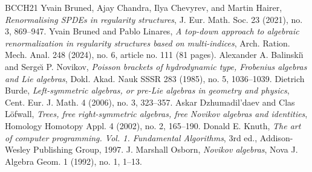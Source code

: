 \begin{thebibliography}{BCCH21}
 Yvain Bruned, Ajay Chandra, Ilya Chevyrev, and Martin Hairer, \emph{Renormalising SPDEs in regularity structures}, J. Eur. Math. Soc. 23 (2021), no. 3, 869--947.
 Yvain Bruned and Pablo Linares, \emph{A top-down approach to algebraic renormalization in regularity structures based on multi-indices}, Arch. Ration. Mech. Anal. 248 (2024), no. 6, article no. 111 (81 pages).
 Alexander A. Balinski\u\i{} and Serge\u\i{} P. Novikov, \emph{Poisson brackets of hydrodynamic type, Frobenius algebras and Lie algebras}, Dokl. Akad. Nauk SSSR 283 (1985), no. 5, 1036--1039.
 Dietrich Burde, \emph{Left-symmetric algebras, or pre-Lie algebras in geometry and physics}, Cent. Eur. J. Math. 4 (2006), no. 3, 323--357.
 Askar Dzhumadil'daev and Clas L\"ofwall, \emph{Trees, free right-symmetric algebras, free Novikov algebras and identities}, Homology Homotopy Appl. 4 (2002), no. 2, 165--190.
 Donald E. Knuth, \emph{The art of computer programming. Vol. 1. Fundamental Algorithms}, 3rd ed., Addison-Wesley Publishing Group, 1997.
 J. Marshall Osborn, \emph{Novikov algebras}, Nova J. Algebra Geom. 1 (1992), no. 1, 1--13.
\end{thebibliography}
